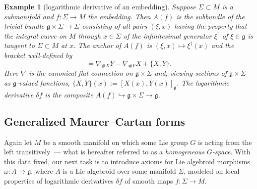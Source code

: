 \documentclass[10pt,a4paper]{amsart}
\numberwithin{equation}{section}
\newtheorem{Example}[Theorem]{Example}
\begin{document}
\begin{Example}[logarithmic derivative of an embedding] Suppose
$\Sigma \subset M$ is a submanifold and $f \colon \Sigma \rightarrow
M$ the embedding. Then $A(f)$ is the subbundle of the trivial bundle
${\mathfrak g} \times \Sigma \rightarrow \Sigma$ consisting of all
pairs $(\xi,x)$ having the property that the integral curve on $M$
through $x \in \Sigma $ of the infinitesimal generator $\xi^\dagger$
of $\xi \in {\mathfrak g} $ is tangent to $\Sigma \subset M$ at
$x$. The anchor of $A(f)$ is $(\xi,x) \mapsto \xi^\dagger(x)$ and the
bracket well-defined by
\begin{equation*} [X,Y]=\nabla_{\#X}Y-\nabla_{\#Y}X +\{X,Y\}.
\end{equation*} Here $\nabla $ is the canonical flat connection on
${\mathfrak g} \times \Sigma$ and, viewing sections of ${\mathfrak g}
\times \Sigma $ as ${\mathfrak g} $-valued functions,
$\{X,Y\}(x):=[X(x),Y(x)]_{\mathfrak g} $. The logarithmic derivative
$\delta f$ is the composite $A(f)\hookrightarrow {\mathfrak g} \times
\Sigma \rightarrow {\mathfrak g}$.
\end{Example}

\subsection*{Generalized Maurer--Cartan forms}%

Again let $M$ be a smooth manifold on which some Lie group $G$ is
acting from the left transitively~--- what is hereafter referred to as
a {\it homogeneous $G$-space}. With this data fixed, our next task is
to introduce axioms for Lie algebroid morphisms
$\omega \colon A \rightarrow {\mathfrak g}$, where $A$ is a Lie
algebroid over some manifold $\Sigma$, modeled on local properties of
logarithmic derivatives $\delta f$ of smooth maps
$f \colon \Sigma \rightarrow M$.
\end{document}
